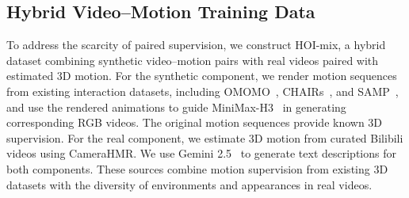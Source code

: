 \subsection{Hybrid Video--Motion Training Data}
\label{sec:training-data}
To address the scarcity of paired supervision, we construct HOI-mix, a hybrid dataset combining synthetic video--motion pairs with real videos paired with estimated 3D motion. For the synthetic component, we render motion sequences from existing interaction datasets, including OMOMO~\citep{li2023omomo}, CHAIRs~\citep{jiang2023chairs}, and SAMP~\citep{hassan2021samp}, and use the rendered animations to guide MiniMax-H3~\citep{minimaxh3} in generating corresponding RGB videos. The original motion sequences provide known 3D supervision. For the real component, we estimate 3D motion from curated Bilibili videos using CameraHMR. We use Gemini 2.5~\citep{comanici2025gemini} to generate text descriptions for both components. These sources combine motion supervision from existing 3D datasets with the diversity of environments and appearances in real videos.

